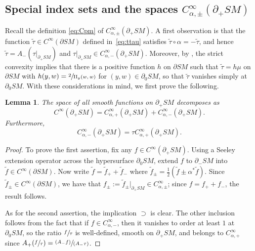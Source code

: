 \documentclass[11pt]{article}
\newcommand{\pspfrac}[2]{\sfrac{(#1)}{(#2)}}
\theoremstyle{plain}
\newtheorem{Lemma}[Theorem]{Lemma}
\theoremstyle{definition}
\theoremstyle{remark}
\def\two{\mathrm{II}}
\newcommand{\del}{\partial}
\begin{document}
\subsection{Special index sets and the spaces $C_{\alpha,\pm}^\infty(\partial_+ SM)$} \label{sec:indexSets}

Recall the definition \eqref{eq:Cpm} of $C_{\alpha,\pm}^\infty(\partial_+ SM)$. A first observation is that the function $\tilde \tau \in C^\infty(\partial SM)$ defined in~\eqref{eq:ttau} satisfies $\tilde\tau \circ \alpha = -\tilde\tau$, and hence $\tilde\tau = A_- (\tau|_{\partial_+ SM})$ and $\tau|_{\partial_+ SM}\in C_{\alpha,-}^\infty(\partial_+ SM)$. Moreover, by \cite[Lem.\,6.11]{Monard2020a}, the strict convexity implies that there is a positive function $h$ on $\partial SM$ such that $\tilde \tau = h \mu$ on $\partial SM$ with $h(y,w) = \sfrac{2}{\two_y(w,w)}$ for $(y,w)\in \partial_0 SM$, so that $\tilde\tau$ vanishes simply at $\partial_0 SM$. With these considerations in mind, we first prove the following.

\begin{Lemma} \label{lem:sum}
The space of all smooth functions on $\del_+ SM$ decomposes as
\begin{equation*}
C^\infty (\partial_+ SM) = C_{\alpha,+}^\infty (\partial_+ SM) + C_{\alpha,-}^\infty (\partial_+ SM).
\end{equation*}
Furthermore,
\begin{equation}
C_{\alpha,-}^\infty (\partial_+ SM) = \tau C_{\alpha,+}^\infty (\partial_+ SM).
\label{eq:Cminusprod}
\end{equation}
\end{Lemma}

\begin{proof} To prove the first assertion, fix any $f\in C^\infty (\partial_+ SM)$. Using a Seeley extension operator across the
hypersurface $\partial_0 SM$, extend $f$ to $\partial_- SM$ into $\tilde f\in C^\infty(\partial SM)$. Now write
$\tilde f = \tilde f_+ + \tilde f_-$ where $\tilde f_{\pm} = \frac{1}{2} (\tilde f \pm \alpha^* \tilde f)$. Since
$\tilde f_\pm \in C^\infty(\partial SM)$, we have that $f_\pm := \tilde f_\pm|_{\partial_+ SM} \in C_{\alpha,\pm}^\infty$;
since $f = f_+ + f_-$, the result follows.

As for the second assertion, the implication $\supset$ is clear. The other inclusion follows from the fact that if
$f\in C^\infty_{\alpha,-}$, then it vanishes to order at least $1$ at $\partial_0 SM$, so the ratio $\sfrac{f}{\tau}$
is well-defined, smooth on $\partial_+ SM$, and belongs to $C_{\alpha,+}^\infty$ since $A_+(\sfrac{f}{\tau}) = \pspfrac{A_- f}{A_-\tau}$.
\end{proof}
\end{document}
